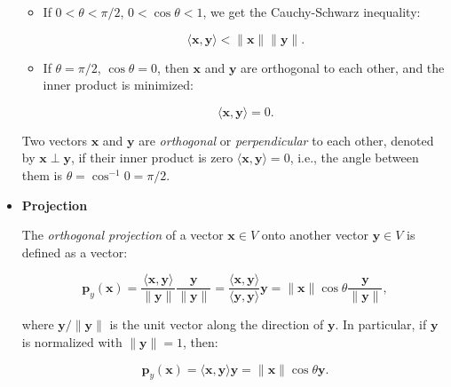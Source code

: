 \documentclass[10pt,b5paper,titlepage]{book}
\begin{document}
\begin{itemize}
\begin{itemize}
            \item If $0 < \theta < \pi / 2$,  $0 < \cos \theta < 1$, we
                get the Cauchy-Schwarz inequality:

                \begin{equation}
                    \langle \mathbf{x}, \mathbf{y} \rangle
                    < \|\mathbf{x}\| \|\mathbf{y}\|
                .\end{equation}

            \item If $\theta = \pi / 2$,  $\cos \theta = 0$, then
                $\mathbf{x}$ and $\mathbf{y}$ are orthogonal to each
                other, and the inner product is minimized:

                \begin{equation}
                    \langle \mathbf{x}, \mathbf{y} \rangle = 0
                .\end{equation}

        \end{itemize}

        Two vectors $\mathbf{x}$ and $\mathbf{y}$ are \textit{orthogonal}
        or \textit{perpendicular} to each other, denoted by
        $\mathbf{x} \perp \mathbf{y}$, if their inner
        product is zero $\langle \mathbf{x}, \mathbf{y} \rangle = 0$,
        i.e., the angle between them is
        $\theta = \cos^{-1} 0 = \pi / 2$.

    \item \textbf{Projection}

        The \textit{orthogonal projection} of a vector $\mathbf{x} \in V$
        onto another vector $\mathbf{y} \in V$ is defined as a vector:

        \begin{equation}
            \mathbf{p}_{y}(\mathbf{x})
            = \frac{\langle \mathbf{x}, \mathbf{y} \rangle}{\|\mathbf{y}\|}
            \frac{\mathbf{y}}{\|\mathbf{y}\|}
            = \frac{\langle \mathbf{x}, \mathbf{y} \rangle}{\langle \mathbf{y}, \mathbf{y} \rangle} \mathbf{y}
            = \|\mathbf{x}\| \cos \theta \frac{\mathbf{y}}{\|\mathbf{y}\|}
        ,\end{equation}

        where $\mathbf{y} / \|\mathbf{y}\|$ is the unit vector along
        the direction of $\mathbf{y}$. In particular, if $\mathbf{y}$
        is normalized with $\|\mathbf{y}\| = 1$, then:

        \begin{equation}
            \mathbf{p}_{y}(\mathbf{x})
            = \langle \mathbf{x}, \mathbf{y} \rangle \mathbf{y}
            = \|\mathbf{x}\| \cos \theta \mathbf{y}
        .\end{equation}


\end{itemize}
\end{document}
